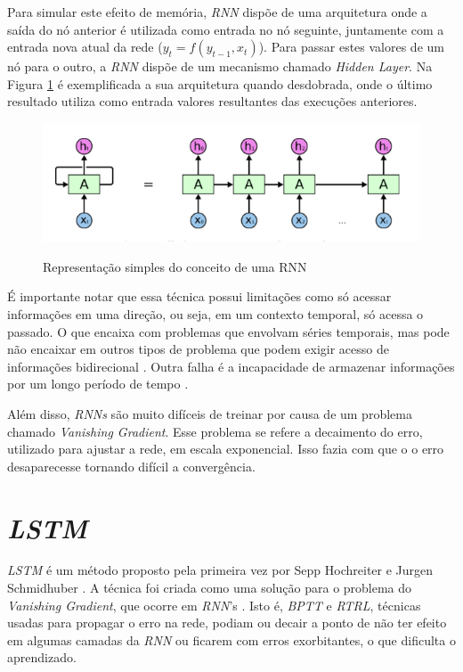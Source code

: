Para simular este efeito de memória, \textit{\acrshort{RNN}} dispõe de uma arquitetura onde a saída do nó anterior é utilizada como entrada no nó seguinte, juntamente com a entrada nova atual da rede (\(y_t = f(y_{t-1}, x_t)\)). Para passar estes valores de um nó para o outro, a \textit{\acrshort{RNN}} dispõe de um mecanismo chamado \textit{Hidden Layer}. Na Figura \ref{figure:rnn} é exemplificada a sua arquitetura quando desdobrada, onde o último resultado utiliza como entrada valores resultantes das execuções anteriores.

\begin{figure}[htbp]
    \centering
    \includegraphics[scale=0.4]{monography/img/models/rnnExample.png}
    \label{figure:rnn}
    \caption[Representação simples do conceito de um RNN]{Representação simples do conceito de uma RNN \footnotemark}
\end{figure}

É importante notar que essa técnica possui limitações como só acessar informações em uma direção, ou seja, em um contexto temporal, só acessa o passado. O que encaixa com problemas que envolvam séries temporais, mas pode não encaixar em outros tipos de problema que podem exigir acesso de informações bidirecional \cite{alex2012}. Outra falha é a incapacidade de armazenar informações por um longo período de tempo \cite{hochreiter2001gradient}. 

Além disso, \textit{\acrshort{RNN}s} são muito difíceis de treinar por causa de um problema chamado \textit{Vanishing Gradient}. Esse problema se refere a decaimento do erro, utilizado para ajustar a rede, em escala exponencial. Isso fazia com que o o erro desaparecesse tornando difícil a convergência. \cite{doi:10.1162/neco.1997.9.8.1735}

\section{\textit{\acrfull{LSTM}}}

\textit{\acrshort{LSTM}} é um método proposto pela primeira vez por Sepp Hochreiter e Jurgen Schmidhuber \cite{doi:10.1162/neco.1997.9.8.1735}. A técnica foi criada como uma solução para o problema do \textit{Vanishing Gradient}, que ocorre em \textit{\acrshort{RNN}}'s \cite{doi:10.1162/neco.1997.9.8.1735}. Isto é, \textit{\acrfull{BPTT}} e \textit{\acrfull{RTRL}}, técnicas usadas para propagar o erro na rede, podiam ou decair a ponto de não ter efeito em algumas camadas da \textit{\acrshort{RNN}} ou ficarem com erros exorbitantes, o que dificulta o aprendizado. 

